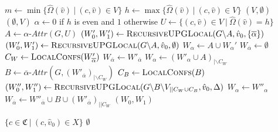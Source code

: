 \begin{algorithm}
	\caption{$\textsc{RecursiveUPGLocal}(\textit{PG } G = (\\
		V \subseteq \mathfrak{C} \times \hat{V},\\
		\hat{V}_0 \subseteq \hat{V},\\
		\hat{V}_1 \subseteq \hat{V},\\
		E \subseteq (\mathfrak{C} \times \hat{V}) \times (\mathfrak{C} \times \hat{V}),\\
		\hat{\Omega} : \hat{V} \rightarrow \mathbb{N}),\\
		\hat{v}_0 \in \hat{V},\\
		\Delta \subseteq \{ 0,1\})$}
	\label{alg_zlnk_collective_local}
	\begin{multicols}{2}
		\begin{algorithmic}[1]
			\State $m \gets \min\{ \hat{\Omega}(\hat{v})\ |\ (c,\hat{v}) \in V\}$
			\State $h \gets\max\{ \hat{\Omega}(\hat{v})\ |\ (c,\hat{v}) \in V\}$
			\State \Return $(V,\emptyset)$
			\Else
			\State \Return $(\emptyset, V)$
			\EndIf
			\EndIf
			\State $\alpha \gets 0$ if $h$ is even and $1$ otherwise
			\State $U \gets \{(c,\hat{v}) \in V\ |\ \hat{\Omega}(\hat{v}) = h\}$
			\State $A \gets \alpha\textit{-Attr}(G, U)$
			\If{$\overline{\alpha} \in \Delta$}
			\State $(W_0', W_1') \gets \textsc{RecursiveUPGLocal}(G \backslash A,\hat{v}_0,\{\overline{\alpha}\})$
			\Else
			\State $(W_0', W_1') \gets \textsc{RecursiveUPGLocal}(G \backslash A,\hat{v}_0,\emptyset)$
			\EndIf
			\State $W_\alpha \gets A \cup W_\alpha'$
			\State $W_{\overline{\alpha}} \gets \emptyset$
			\Else
				\State $C_W \gets \textsc{LocalConfs}(W'_{\overline{\alpha}})$
					\State $W_{\overline{\alpha}} \gets W'_{\overline{\alpha}}$
					\State $W_\alpha \gets (W'_\alpha \cup A)_{|\backslash C_W}$
				\Else
				\State $B \gets \overline{\alpha}\textit{-Attr}(G, (W'_{\overline{\alpha}})_{|\backslash C_W})$
				\State $C_B \gets \textsc{LocalConfs}(B)$
				\State $(W_0'', W_1'') \gets \textsc{RecursiveUPGLocal}(G \backslash B\backslash V_{|| C_W \cup C_B}, \hat{v}_0, \Delta)$
				\State $W_\alpha \gets W''_\alpha$
				\State $W_{\overline{\alpha}} \gets W''_{\overline{\alpha}} \cup B \cup (W'_{\overline{\alpha}})_{||C_W}$
				\EndIf
			\EndIf
			\State \Return $(W_0, W_1)$
		\end{algorithmic}\bigskip\bigskip\bigskip\bigskip\bigskip\bigskip\bigskip\bigskip\bigskip\bigskip\bigskip\bigskip\bigskip\bigskip\bigskip\bigskip\bigskip\bigskip\bigskip\bigskip\bigskip\bigskip\bigskip\bigskip\bigskip\bigskip
		\begin{algorithmic}[1]
			\If{$\overline{\alpha} \in \Delta$}
				\State \Return $\{ c \in \mathfrak{C}\ |\ (c, \hat{v}_0) \in X \}$
			\Else
				\State \Return $\emptyset$
			\EndIf
			\EndFunction
		\end{algorithmic}
	\end{multicols}
\end{algorithm}

